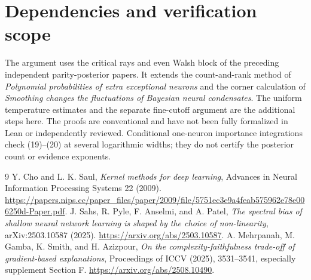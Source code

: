 \documentclass[11pt]{article}
\begin{document}
\section*{Dependencies and verification scope}
The argument uses the critical rays and even Walsh block of the preceding
independent parity-posterior papers. It extends the count-and-rank method
of \emph{Polynomial probabilities of extra exceptional neurons} and the
corner calculation of \emph{Smoothing changes the fluctuations of Bayesian
neural condensates}. The uniform temperature estimates and the separate
fine-cutoff argument are the additional steps here. The proofs are
conventional and have not been fully formalized in Lean or independently
reviewed. Conditional one-neuron importance integrations check (19)--(20)
at several logarithmic widths; they do not certify the posterior count
or evidence exponents.
\begin{thebibliography}{9}
 Y. Cho and L. K. Saul,
\emph{Kernel methods for deep learning}, Advances in Neural Information
Processing Systems 22 (2009).
\url{https://papers.nips.cc/paper_files/paper/2009/file/5751ec3e9a4feab575962e78e006250d-Paper.pdf}.
 J. Sahs, R. Pyle, F. Anselmi, and A. Patel,
\emph{The spectral bias of shallow neural network learning is shaped
by the choice of non-linearity}, arXiv:2503.10587 (2025).
\url{https://arxiv.org/abs/2503.10587}.
 A. Mehrpanah, M. Gamba, K. Smith, and H. Azizpour,
\emph{On the complexity-faithfulness trade-off of gradient-based explanations},
Proceedings of ICCV (2025), 3531--3541, especially supplement Section F.
\url{https://arxiv.org/abs/2508.10490}.
\end{thebibliography}
\end{document}
